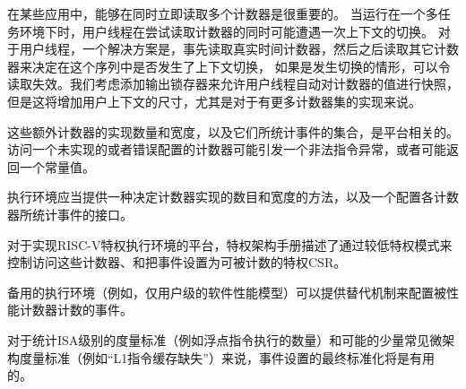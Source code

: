 \begin{commentary}
  在某些应用中，能够在同时立即读取多个计数器是很重要的。
  当运行在一个多任务环境下时，用户线程在尝试读取计数器的同时可能遭遇一次上下文的切换。
  对于用户线程，一个解决方案是，事先读取真实时间计数器，然后之后读取其它计数器来决定在这个序列中是否发生了上下文切换，
  如果是发生切换的情形，可以令读取失效。我们考虑添加输出锁存器来允许用户线程自动对计数器的值进行快照，
  但是这将增加用户上下文的尺寸，尤其是对于有更多计数器集的实现来说。
\end{commentary}

这些额外计数器的实现数量和宽度，以及它们所统计事件的集合，是平台相关的。
访问一个未实现的或者错误配置的计数器可能引发一个非法指令异常，或者可能返回一个常量值。

执行环境应当提供一种决定计数器实现的数目和宽度的方法，以及一个配置各计数器所统计事件的接口。

\begin{commentary}
  对于实现RISC-V特权执行环境的平台，特权架构手册描述了通过较低特权模式来控制访问这些计数器、和把事件设置为可被计数的特权CSR。

  备用的执行环境（例如，仅用户级的软件性能模型）可以提供替代机制来配置被性能计数器计数的事件。

  对于统计ISA级别的度量标准（例如浮点指令执行的数量）和可能的少量常见微架构度量标准（例如“L1指令缓存缺失”）来说，事件设置的最终标准化将是有用的。
\end{commentary}
